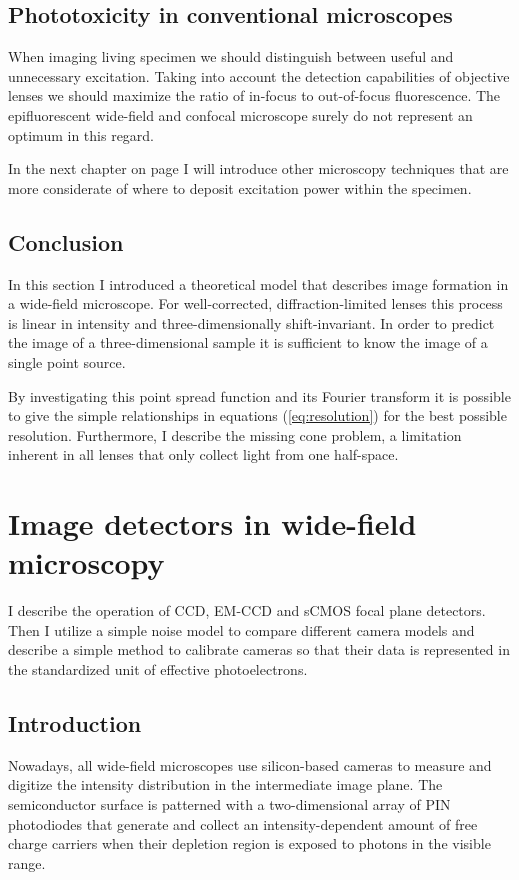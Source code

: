 
\subsection{Phototoxicity in conventional microscopes}
When imaging living specimen we should distinguish between useful and
unnecessary excitation. Taking into account the detection capabilities
of objective lenses we should maximize the ratio of in-focus to
out-of-focus fluorescence. The epifluorescent wide-field and confocal
microscope surely do not represent an optimum in this regard.

In the next chapter on page \pageref{sec:approaches} I will introduce
other microscopy techniques that are more considerate of where to
deposit excitation power within the specimen.

\subsection{Conclusion}
\label{sec:widefield-conclusion}
In this section I introduced a theoretical model that describes image
formation in a wide-field microscope. For well-corrected,
diffraction-limited lenses this process is linear in intensity and
three-dimensionally shift-invariant. In order to predict the image of
a three-dimensional sample it is sufficient to know the image of a
single point source.

By investigating this point spread function and its Fourier transform
it is possible to give the simple relationships in equations
(\ref{eq:resolution}) for the best possible resolution. Furthermore, I
describe the missing cone problem, a limitation inherent in all lenses
that only collect light from one half-space.



\section{Image detectors in wide-field microscopy}
\label{sec:ccd-intro}
\begin{summary}
  I describe the operation of CCD, EM-CCD and sCMOS focal plane
  detectors. Then I utilize a simple noise model to compare different
  camera models and describe a simple method to calibrate cameras so
  that their data is represented in the standardized unit of effective
  photoelectrons.
\end{summary}

\subsection{Introduction}
Nowadays, all wide-field microscopes use silicon-based cameras to
measure  and digitize the intensity distribution in the
intermediate image plane. The semiconductor surface is patterned with
a two-dimensional array of PIN photodiodes that generate and collect
an intensity-dependent amount of free charge carriers when their
depletion region is exposed to photons in the visible range.

